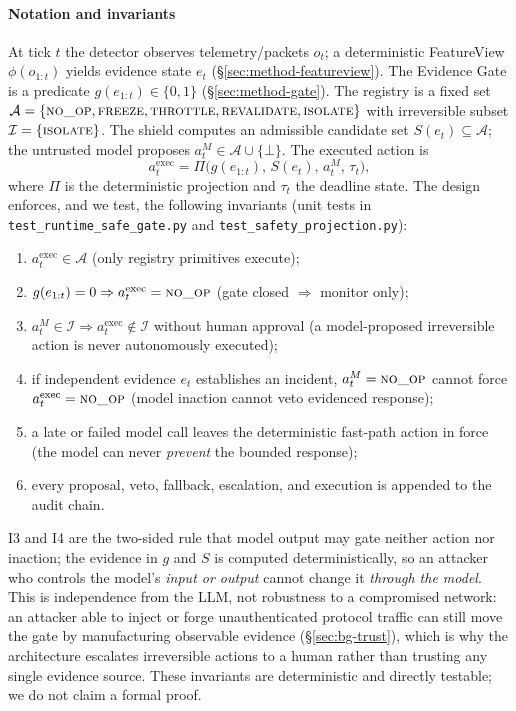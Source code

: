 \paragraph{Notation and invariants}
At tick $t$ the detector observes telemetry/packets $o_t$; a deterministic
FeatureView $\phi(o_{1:t})$ yields evidence state $e_t$ (\S\ref{sec:method-featureview}).
The Evidence Gate is a predicate $g(e_{1:t})\in\{0,1\}$
(\S\ref{sec:method-gate}). The registry is a fixed set
$\mathcal{A}=\{\textsc{no\_op},\textsc{freeze},\textsc{throttle},
\textsc{revalidate},\textsc{isolate}\}$ with irreversible subset
$\mathcal{I}=\{\textsc{isolate}\}$. The shield computes an admissible candidate set
$S(e_t)\subseteq\mathcal{A}$; the untrusted model proposes
$a^M_t\in\mathcal{A}\cup\{\bot\}$. The executed action is
$$
a^{\text{exec}}_t=\Pi\big(g(e_{1:t}),\,S(e_t),\,a^M_t,\,\tau_t\big),
$$
where $\Pi$ is the deterministic projection and $\tau_t$ the deadline state.
The design enforces, and we test, the following invariants (unit tests in
\texttt{test\_\allowbreak runtime\_\allowbreak safe\_\allowbreak gate.py} and
\texttt{test\_\allowbreak safety\_\allowbreak projection.py}):
\begin{enumerate}
\item[(I1)] $a^{\text{exec}}_t\in\mathcal{A}$ (only registry primitives execute);
\item[(I2)] $g(e_{1:t})=0 \Rightarrow a^{\text{exec}}_t=\textsc{no\_op}$ (gate closed $\Rightarrow$ monitor only);
\item[(I3)] $a^M_t\in\mathcal{I} \Rightarrow a^{\text{exec}}_t\notin\mathcal{I}$ without human approval (a model-proposed irreversible action is never autonomously executed);
\item[(I4)] if independent evidence $e_t$ establishes an incident, $a^M_t=\textsc{no\_op}$ cannot force $a^{\text{exec}}_t=\textsc{no\_op}$ (model inaction cannot veto evidenced response);
\item[(I5)] a late or failed model call leaves the deterministic fast-path action in force (the model can never \emph{prevent} the bounded response);
\item[(I6)] every proposal, veto, fallback, escalation, and execution is appended to the audit chain.
\end{enumerate}
I3 and I4 are the two-sided rule that model output may gate neither action
nor inaction; the evidence in $g$ and $S$ is computed deterministically,
so an attacker who controls the model's \emph{input or output} cannot
change it \emph{through the model}. This is independence from the LLM, not
robustness to a compromised network: an attacker able to inject or forge
unauthenticated protocol traffic can still move the gate by manufacturing
observable evidence (\S\ref{sec:bg-trust}), which is why the architecture
escalates irreversible actions to a human rather than trusting any single
evidence source. These invariants are deterministic and directly testable;
we do not claim a formal proof.

